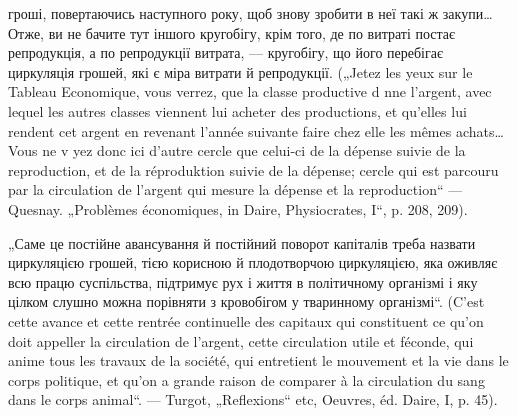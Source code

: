 гроші, повертаючись наступного року, щоб знову зробити в неї такі ж закупи…
Отже, ви не бачите тут іншого кругобігу, крім того, де по витраті
постає репродукція, а по репродукції витрата, — кругобігу, що його перебігає
циркуляція грошей, які є міра витрати й репродукції. („Jetez les yeux sur le
Tableau Economique, vous verrez, que la classe productive d nne l’argent,
avec lequel les autres classes viennent lui acheter des productions, et qu’elles lui
rendent cet argent en revenant l’année suivante faire chez elle les mêmes achats…
Vous ne v yez donc ici d’autre cercle que celui-ci de la dépense suivie de la reproduction,
et de la réproduktion suivie de la dépense; cercle qui est parcouru par la
circulation de l’argent qui mesure la dépense et la reproduction“ — Quesnay. „Problèmes
économiques, in Daire, Physiocrates, I“, p. 208, 209).

„Саме це постійне авансування й постійний поворот капіталів треба назвати
циркуляцією грошей, тією корисною й плодотворчою циркуляцією, яка оживляє
всю працю суспільства, підтримує рух і життя в політичному організмі і яку
цілком слушно можна порівняти з кровобігом у тваринному організмі“. (C’est
cette avance et cette rentrée continuelle des capitaux qui constituent ce qu’on doit
appeller la circulation de l’argent, cette circulation utile et féconde, qui anime tous
les travaux de la société, qui entretient le mouvement et la vie dans le corps politique,
et qu’on a grande raison de comparer à la circulation du sang dans le corps animal“.
— Turgot, „Reflexions“ etc, Oeuvres, éd. Daire, I, p. 45).

